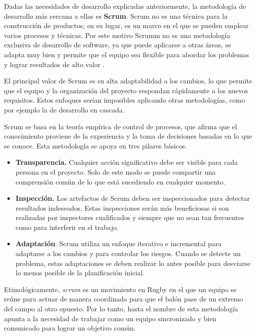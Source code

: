 Dadas las necesidades de desarrollo explicadas anteriormente, la metodología de desarrollo más cercana a ellas es \textbf{Scrum}. Scrum no es una técnica para la construcción de productos; en su lugar, es un marco en el que se pueden emplear varios procesos y técnicas. Por este motivo Scrumm no es una metodología exclusiva de desarrollo de software, ya que puede aplicarse a otras áreas, se adapta muy bien y permite que el equipo sea flexible para abordar los problemas y lograr resultados de alto valor \cite{scrum-guide}.

El principal valor de Scrum es su alta adaptabilidad a los cambios, lo que permite que el equipo y la organización del proyecto respondan rápidamente a los nuevos requisitos. Estos enfoques serían imposibles aplicando otras metodologías, como por ejemplo la de desarrollo en cascada.

Scrum se basa en la teoría empírica de control de procesos, que afirma que el conocimiento proviene de la experiencia y la toma de decisiones basadas en lo que se conoce. Esta metodología se apoya en tres pilares básicos.

\begin{itemize}
    \item \textbf{Transparencia.} Cualquier acción significativo debe ser visible para cada persona en el proyecto. Solo de este modo se puede compartir una comprensión común de lo que está sucediendo en cualquier momento.
    
    \item \textbf{Inspección.} Los artefactos de Scrum deben ser inspeccionados para detectar resultados indeseados. Estas inspecciones serán más beneficiosas si son realizadas por inspectores cualificados y siempre que no sean tan frecuentes como para interferir en el trabajo.

    \item \textbf{Adaptación}. Scrum utiliza un enfoque iterativo e incremental para adaptarse a los cambios y para controlar los riesgos. Cuando se detecte un problema, estas adaptaciones se deben realizar lo antes posible para desviarse lo menos posible de la planificación inicial.
\end{itemize}

Etimológicamente, \textit{scrum} es un movimiento en Rugby en el que un equipo se reúne para actuar de manera coordinada para que el balón pase de un extremo del campo al otro opuesto. Por lo tanto, hasta el nombre de esta metodología apunta a la necesidad de trabajar como un equipo sincronizado y bien comunicado para lograr un objetivo común.

